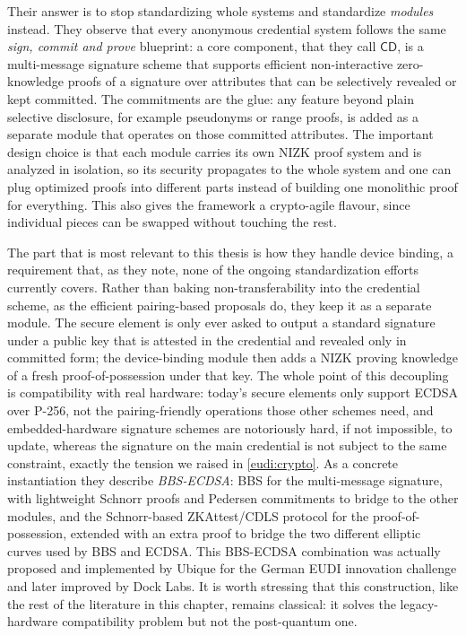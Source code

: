\documentclass[binding=0.6cm,oneside,noexaminfo]{sapthesis}
\begin{document}
Their answer is to stop standardizing whole systems and standardize \emph{modules} instead. They observe that every
anonymous credential system follows the same \emph{sign, commit and prove} blueprint: a core component, that they call
$\mathsf{CD}$, is a multi-message signature scheme that supports efficient non-interactive zero-knowledge proofs of a
signature over attributes that can be selectively revealed or kept committed. The commitments are the glue: any feature
beyond plain selective disclosure, for example pseudonyms or range proofs, is added as a separate module that operates
on those committed attributes. The important design choice is that each module carries its own NIZK proof system and is
analyzed in isolation, so its security propagates to the whole system and one can plug optimized proofs into different
parts instead of building one monolithic proof for everything. This also gives the framework a crypto-agile flavour,
since individual pieces can be swapped without touching the rest.

The part that is most relevant to this thesis is how they handle device binding, a requirement that, as they note, none
of the ongoing standardization efforts currently covers. Rather than baking non-transferability into the credential
scheme, as the efficient pairing-based proposals do, they keep it as a separate module. The secure element is only ever
asked to output a standard signature under a public key that is attested in the credential and revealed only in
committed form; the device-binding module then adds a NIZK proving knowledge of a fresh proof-of-possession under that
key. The whole point of this decoupling is compatibility with real hardware: today's secure elements only support ECDSA
over P-256, not the pairing-friendly operations those other schemes need, and embedded-hardware signature schemes are
notoriously hard, if not impossible, to update, whereas the signature on the main credential is not subject to the same
constraint, exactly the tension we raised in \cref{eudi:crypto}. As a concrete instantiation they describe
\emph{BBS-ECDSA}: BBS for the multi-message signature, with lightweight Schnorr proofs and Pedersen commitments to
bridge to the other modules, and the Schnorr-based ZKAttest/CDLS protocol for the proof-of-possession, extended with an
extra proof to bridge the two different elliptic curves used by BBS and ECDSA. This BBS-ECDSA combination was actually
proposed and implemented by Ubique for the German EUDI innovation challenge and later improved by Dock Labs. It is worth
stressing that this construction, like the rest of the literature in this chapter, remains classical: it solves the
legacy-hardware compatibility problem but not the post-quantum one.
\end{document}
